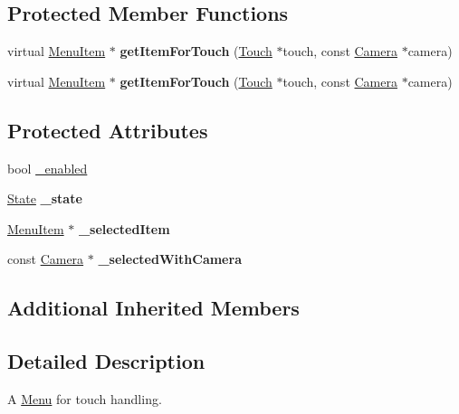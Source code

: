 \subsection*{Protected Member Functions}
\begin{DoxyCompactItemize}
\item 
\mbox{\label{classMenu_a2143949223bf371ec16977821bc06b4d}} 
virtual \hyperlink{classMenuItem}{Menu\+Item} $\ast$ {\bfseries get\+Item\+For\+Touch} (\hyperlink{classTouch}{Touch} $\ast$touch, const \hyperlink{classCamera}{Camera} $\ast$camera)
\item 
\mbox{\label{classMenu_ac4e40becec7d8fa42d8ebf0aef4c502a}} 
virtual \hyperlink{classMenuItem}{Menu\+Item} $\ast$ {\bfseries get\+Item\+For\+Touch} (\hyperlink{classTouch}{Touch} $\ast$touch, const \hyperlink{classCamera}{Camera} $\ast$camera)
\end{DoxyCompactItemize}
\subsection*{Protected Attributes}
\begin{DoxyCompactItemize}
\item 
bool \hyperlink{classMenu_a37190ed4d5d13bb631a0fe23bf307180}{\+\_\+enabled}
\item 
\mbox{\label{classMenu_a54e798118e41a3b9c61d56474db9797c}} 
\hyperlink{classMenu_a8269685e78203b028d5bd77c339898b2}{State} {\bfseries \+\_\+state}
\item 
\mbox{\label{classMenu_af0796632f3b33e3fc9d3fc8276af1fde}} 
\hyperlink{classMenuItem}{Menu\+Item} $\ast$ {\bfseries \+\_\+selected\+Item}
\item 
\mbox{\label{classMenu_a69806e8f8bf6f31523068342405aeda9}} 
const \hyperlink{classCamera}{Camera} $\ast$ {\bfseries \+\_\+selected\+With\+Camera}
\end{DoxyCompactItemize}
\subsection*{Additional Inherited Members}


\subsection{Detailed Description}
A \hyperlink{classMenu}{Menu} for touch handling. 

